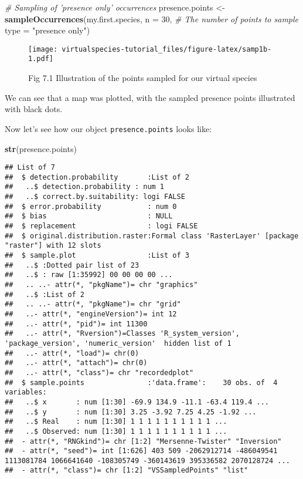 \documentclass[]{article}
\newenvironment{Shaded}{\begin{snugshade}}{\end{snugshade}}
\newcommand{\KeywordTok}[1]{\textcolor[rgb]{0.13,0.29,0.53}{\textbf{#1}}}
\newcommand{\DataTypeTok}[1]{\textcolor[rgb]{0.13,0.29,0.53}{#1}}
\newcommand{\DecValTok}[1]{\textcolor[rgb]{0.00,0.00,0.81}{#1}}
\newcommand{\StringTok}[1]{\textcolor[rgb]{0.31,0.60,0.02}{#1}}
\newcommand{\CommentTok}[1]{\textcolor[rgb]{0.56,0.35,0.01}{\textit{#1}}}
\newcommand{\NormalTok}[1]{#1}
\begin{document}
\begin{Shaded}
\begin{Highlighting}[]
\CommentTok{# Sampling of 'presence only' occurrences}
\NormalTok{presence.points <-}\StringTok{ }\KeywordTok{sampleOccurrences}\NormalTok{(my.first.species,}
                                     \DataTypeTok{n =} \DecValTok{30}\NormalTok{, }\CommentTok{# The number of points to sample}
                                     \DataTypeTok{type =} \StringTok{"presence only"}\NormalTok{)}
\end{Highlighting}
\end{Shaded}

\begin{figure}
\centering
\texttt{[image: virtualspecies-tutorial\_files/figure-latex/samp1b-1.pdf]}
\caption{Fig 7.1 Illustration of the points sampled for our virtual
species}
\end{figure}

We can see that a map was plotted, with the sampled presence points
illustrated with black dots.

Now let's see how our object \texttt{presence.points} looks like:

\begin{Shaded}
\begin{Highlighting}[]
\KeywordTok{str}\NormalTok{(presence.points)}
\end{Highlighting}
\end{Shaded}

\begin{verbatim}
## List of 7
##  $ detection.probability       :List of 2
##   ..$ detection.probability : num 1
##   ..$ correct.by.suitability: logi FALSE
##  $ error.probability           : num 0
##  $ bias                        : NULL
##  $ replacement                 : logi FALSE
##  $ original.distribution.raster:Formal class 'RasterLayer' [package "raster"] with 12 slots
##  $ sample.plot                 :List of 3
##   ..$ :Dotted pair list of 23
##   ..$ : raw [1:35992] 00 00 00 00 ...
##   .. ..- attr(*, "pkgName")= chr "graphics"
##   ..$ :List of 2
##   .. ..- attr(*, "pkgName")= chr "grid"
##   ..- attr(*, "engineVersion")= int 12
##   ..- attr(*, "pid")= int 11300
##   ..- attr(*, "Rversion")=Classes 'R_system_version', 'package_version', 'numeric_version'  hidden list of 1
##   ..- attr(*, "load")= chr(0) 
##   ..- attr(*, "attach")= chr(0) 
##   ..- attr(*, "class")= chr "recordedplot"
##  $ sample.points               :'data.frame':    30 obs. of  4 variables:
##   ..$ x       : num [1:30] -69.9 134.9 -11.1 -63.4 119.4 ...
##   ..$ y       : num [1:30] 3.25 -3.92 7.25 4.25 -1.92 ...
##   ..$ Real    : num [1:30] 1 1 1 1 1 1 1 1 1 1 ...
##   ..$ Observed: num [1:30] 1 1 1 1 1 1 1 1 1 1 ...
##  - attr(*, "RNGkind")= chr [1:2] "Mersenne-Twister" "Inversion"
##  - attr(*, "seed")= int [1:626] 403 509 -2062912714 -486049541 1113081784 1066641640 -108305749 -360143619 395336582 2070128724 ...
##  - attr(*, "class")= chr [1:2] "VSSampledPoints" "list"
\end{verbatim}
\end{document}
